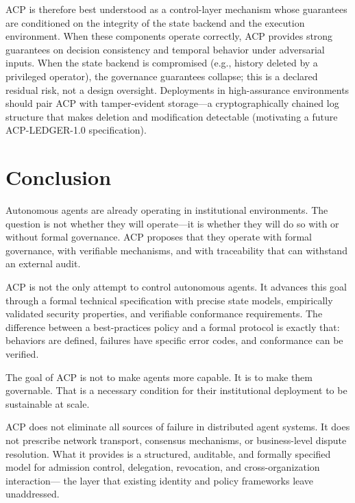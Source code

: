 \documentclass[11pt]{article}
\theoremstyle{definition}
\begin{document}
ACP is therefore best understood as a control-layer mechanism whose guarantees are
conditioned on the integrity of the state backend and the execution environment.
When these components operate correctly, ACP provides strong guarantees on decision
consistency and temporal behavior under adversarial inputs.
When the state backend is compromised (e.g., history deleted by a privileged operator),
the governance guarantees collapse; this is a declared residual risk, not a
design oversight.
Deployments in high-assurance environments should pair ACP with tamper-evident
storage---a cryptographically chained log structure that makes deletion and
modification detectable (motivating a future ACP-LEDGER-1.0 specification).

\section{Conclusion}

Autonomous agents are already operating in institutional environments.
The question is not whether they will operate---it is whether they will do so with or without formal governance.
ACP proposes that they operate with formal governance, with verifiable mechanisms,
and with traceability that can withstand an external audit.

ACP is not the only attempt to control autonomous agents.
It advances this goal through a formal technical specification with precise state models,
empirically validated security properties, and verifiable conformance requirements.
The difference between a best-practices policy and a formal protocol is exactly that:
behaviors are defined, failures have specific error codes, and conformance can be verified.

The goal of ACP is not to make agents more capable. It is to make them governable.
That is a necessary condition for their institutional deployment to be sustainable at scale.

ACP does not eliminate all sources of failure in distributed agent systems.
It does not prescribe network transport, consensus mechanisms, or business-level dispute resolution.
What it provides is a structured, auditable, and formally specified model for
admission control, delegation, revocation, and cross-organization interaction---
the layer that existing identity and policy frameworks leave unaddressed.
\end{document}

